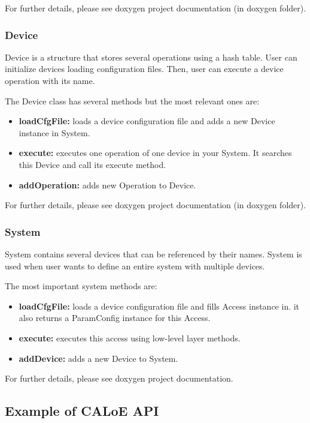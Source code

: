 For further details, please see doxygen project documentation (in doxygen folder).

\subsubsection{Device}

Device is a structure that stores several operations using a hash table. User can initialize devices loading configuration files. Then, user can execute a device operation with its name.

The Device class has several methods but the most relevant ones are:

\begin{itemize}
\item{\textbf{loadCfgFile:} loads a device configuration file and adds a new Device instance in System.}
\item{\textbf{execute:} executes one operation of one device in your System. It searches this Device and call its execute method.}
\item{\textbf{addOperation:} adds new Operation to Device.}
\end{itemize}

For further details, please see doxygen project documentation (in doxygen folder).

\subsubsection{System}

System contains several devices that can be referenced by their names. System is used when user wants to define an entire system with multiple devices.

The most important system methods are:

\begin{itemize}
\item{\textbf{loadCfgFile:} loads a device configuration file and fills Access instance in. it also returns a ParamConfig instance for this Access.}
\item{\textbf{execute:} executes this access using low-level layer methods.}
\item{\textbf{addDevice:} adds a new Device to System.}
\end{itemize}

For further details, please see doxygen project documentation.

\subsection{Example of CALoE API}

